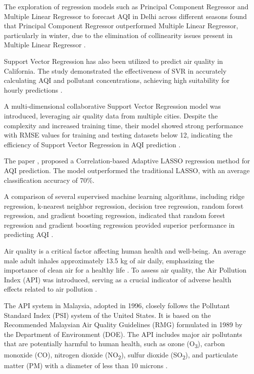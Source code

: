 \documentclass{book}
\numberwithin{equation}{section}
\numberwithin{figure}{section}
\begin{document}
The exploration of regression models such as Principal Component Regressor and Multiple Linear Regressor to forecast AQI in Delhi across different seasons found that Principal Component Regressor outperformed Multiple Linear Regressor, particularly in winter, due to the elimination of collinearity issues present in Multiple Linear Regressor \cite{kumar2011}.

Support Vector Regression has also been utilized to predict air quality in California. The study demonstrated the effectiveness of SVR in accurately calculating AQI and pollutant concentrations, achieving high suitability for hourly predictions \cite{castelli2020}.

A multi-dimensional collaborative Support Vector Regression model was introduced, leveraging air quality data from multiple cities. Despite the complexity and increased training time, their model showed strong performance with RMSE values for training and testing datasets below 12, indicating the efficiency of Support Vector Regression in AQI prediction \cite{liu2017}.

The paper \cite{sethi2021}, proposed a Correlation-based Adaptive LASSO regression method for AQI prediction. The model outperformed the traditional LASSO, with an average classification accuracy of 70\%.

A comparison of several supervised machine learning algorithms, including ridge regression, k-nearest neighbor regression, decision tree regression, random forest regression, and gradient boosting regression, indicated that random forest regression and gradient boosting regression provided superior performance in predicting AQI \cite{li2021}.

Air quality is a critical factor affecting human health and well-being. An average male adult inhales approximately 13.5 kg of air daily, emphasizing the importance of clean air for a healthy life \citep{leong2019prediction}. To assess air quality, the Air Pollution Index (API) was introduced, serving as a crucial indicator of adverse health effects related to air pollution \citep{hajek2015predicting}.

The API system in Malaysia, adopted in 1996, closely follows the Pollutant Standard Index (PSI) system of the United States. It is based on the Recommended Malaysian Air Quality Guidelines (RMG) formulated in 1989 by the Department of Environment (DOE). The API includes major air pollutants that are potentially harmful to human health, such as ozone (O\textsubscript{3}), carbon monoxide (CO), nitrogen dioxide (NO\textsubscript{2}), sulfur dioxide (SO\textsubscript{2}), and particulate matter (PM) with a diameter of less than 10 microns \citep{leong2019prediction}.
\end{document}
